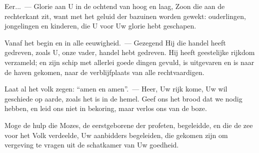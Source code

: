 \documentclass[12pt,twoside,a5paper]{article}
\begin{document}
\begin{halfparskip}
  Eer...~--- Glorie aan U in de ochtend van hoog en laag, Zoon die aan de rechterkant zit, want met het geluid der bazuinen worden gewekt: ouderlingen, jongelingen en kinderen, die U voor Uw glorie hebt geschapen.

  Vanaf het begin en in alle eeuwigheid.~--- Gezegend Hij die handel heeft gedreven, zoals U, onze vader, handel hebt gedreven. Hij heeft geestelijke rijkdom verzameld; en zijn schip met allerlei goede dingen gevuld, is uitgevaren en is naar de haven gekomen, naar de verblijfplaats van alle rechtvaardigen.

  Laat al het volk zegen: ``amen en amen''.~--- Heer, Uw rijk kome, Uw wil geschiede op aarde, zoals het is in de hemel. Geef ons het brood dat we nodig hebben, en leid ons niet in bekoring, maar verlos ons van de boze.

  Moge de hulp die Mozes, de eerstgeborene der profeten, begeleidde, en die de zee voor het Volk verdeelde, Uw aanbidders begeleiden, die gekomen zijn om vergeving te vragen uit de schatkamer van Uw goedheid.
\end{halfparskip}

\end{document}
